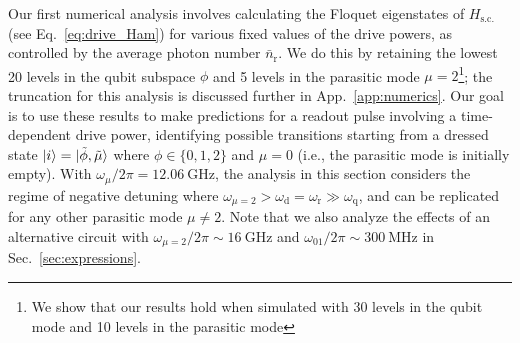 \documentclass[%
reprint,
superscriptaddress,
 amsmath,amssymb,
 aps,
 prx,
longbibliography,
floatfix,
]{revtex4-2}
\begin{document}
Our first numerical analysis involves calculating the Floquet eigenstates of $H_\textrm{s.c.}$ (see Eq.~\ref{eq:drive_Ham}) for various fixed values of the drive powers, as controlled by the average photon number $\bar n_\textrm{r}$. We do this by retaining the lowest 20 levels in the qubit subspace $\phi$ and 5 levels in the parasitic mode $\mu=2$\footnote{We show that our results hold when simulated with 30 levels in the qubit mode and 10 levels in the parasitic mode}; the truncation for this analysis is discussed further in App.~\ref{app:numerics}. Our goal is to use these results to make predictions for a readout pulse involving a time-dependent drive power, identifying possible transitions starting from a dressed state $\ket{i} =\ket{\tilde{\phi}, \tilde{\mu}}$ where $\phi\in\{0,1,2\}$ and $\mu=0$ (i.e., the parasitic mode is initially empty). With $\omega_\mu/2\pi=12.06 \ \mathrm{GHz}$, the analysis in this section considers the regime of negative detuning where $\omega_{\mu=2}>\omega_\textrm{d}=\omega_\textrm{r} \gg \omega_\textrm{q}$, and can be replicated for any other parasitic mode $\mu \neq 2$. Note that we also analyze the effects of an alternative circuit with $\omega_{\mu=2}/2\pi\sim 16 \ \mathrm{GHz}$ and $\omega_{01}/2\pi\sim 300 \ \mathrm{MHz}$ in Sec.~\ref{sec:expressions}.
\end{document}
